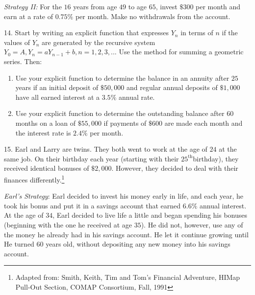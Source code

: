 \documentclass[10pt,]{book}
\theoremstyle{plain}
\theoremstyle{definition}
\theoremstyle{definition}
\theoremstyle{definition}
\numberwithin{equation}{section}
\begin{document}
\begin{exerciselist}
\par
\hypertarget{p-187}{}%
\emph{Strategy II:} For the \(16\) years from age \(49\) to age \(65\), invest \(\$300\) per month and earn at a rate of \(0.75\%\) per month. Make no withdrawals from the account.%
\par\smallskip
\item[14.]\hypertarget{exercise-45}{}\hypertarget{p-188}{}%
Start by writing an explicit function that expresses \(Y_n\) in terms of \(n\) if the values of \(Y_n\) are generated by the recursive system \(Y_0=A, Y_n=aY_{n-1}+b, n = 1, 2, 3, ...\) Use the method for summing a geometric series. Then:%
\leavevmode%
\begin{enumerate}[label=(\alph*)]
\item\hypertarget{li-96}{}Use your explicit function to determine the balance in an annuity after \(25\) years if an initial deposit of \(\$50,000\) and regular annual deposits of \(\$1,000\) have all earned interest at a \(3.5\%\) annual rate.%
\item\hypertarget{li-97}{}Use your explicit function to determine the outstanding balance after \(60\) months on a loan of \(\$55,000\) if payments of \(\$600\) are made each month and the interest rate is \(2.4\%\) per month.%
\end{enumerate}
\par\smallskip
\item[15.]\hypertarget{exercise-46}{}\hypertarget{p-189}{}%
Earl and Larry are twins.  They both went to work at the age of \(24\) at the same job.  On their birthday each year (starting with their \(25^{\text{th}}\)birthday), they received identical bonuses of \(\$2,000\).  However, they decided to deal with their finances differently.\footnote{Adapted from: Smith, Keith, Tim and Tom's Financial Adventure, HIMap Pull-Out Section, COMAP Consortium, Fall, 1991\label{fn-3}}%
\par
\hypertarget{p-190}{}%
%
\par
\hypertarget{p-191}{}%
\emph{Earl's Strategy}: Earl decided to invest his money early in life, and each year, he took his bonus and put it in a savings account that earned \(6.6\%\) annual interest.  At the age of \(34\), Earl decided to live life a little and began spending his bonuses (beginning with the one he received at age \(35\)).  He did not, however, use any of the money he already had in his savings account.  He let it continue growing until He turned \(60\) years old, without depositing any new money into his savings account.%
\par

\end{exerciselist}
\end{document}
